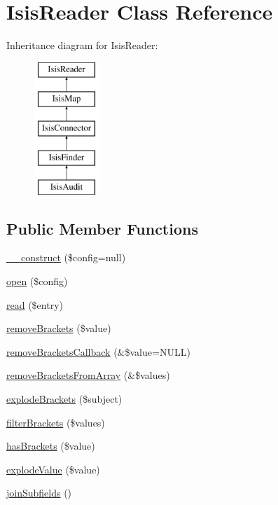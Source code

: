 \hypertarget{classIsisReader}{
\section{IsisReader Class Reference}
\label{classIsisReader}
}
Inheritance diagram for IsisReader:\begin{figure}[H]
\begin{center}
\leavevmode
\includegraphics[height=5cm]{classIsisReader}
\end{center}
\end{figure}
\subsection*{Public Member Functions}
\begin{DoxyCompactItemize}
\item 
\hyperlink{classIsisReader_a70d1444cf56269795b4947dd82b2a4ac}{\_\-\_\-construct} (\$config=null)
\item 
\hyperlink{classIsisReader_afa6e3d3d94854913e5ed2604919d2316}{open} (\$config)
\item 
\hyperlink{classIsisReader_a630791a319bec2bc55d0102cbb7f93df}{read} (\$entry)
\item 
\hyperlink{classIsisReader_a99ce7b10b2997dad6a64558ac1f9f10e}{removeBrackets} (\$value)
\item 
\hyperlink{classIsisReader_acba8842f0033356fff66c0f88391921e}{removeBracketsCallback} (\&\$value=NULL)
\item 
\hyperlink{classIsisReader_a60ece3bbe11a2b4ac6afa6e65f282724}{removeBracketsFromArray} (\&\$values)
\item 
\hyperlink{classIsisReader_a4610ebcf69c197e2c596965e2dc0358e}{explodeBrackets} (\$subject)
\item 
\hyperlink{classIsisReader_aa6099ed6bd276b32bd7bba184f144529}{filterBrackets} (\$values)
\item 
\hyperlink{classIsisReader_a109a6ef49b2190bfbcee796dae954baf}{hasBrackets} (\$value)
\item 
\hyperlink{classIsisReader_a3cc08df25da082046d496db93778709b}{explodeValue} (\$value)
\item 
\hyperlink{classIsisReader_ae65e172e3b5c9ac3c8a5e1352ba80904}{joinSubfields} ()
\end{DoxyCompactItemize}


